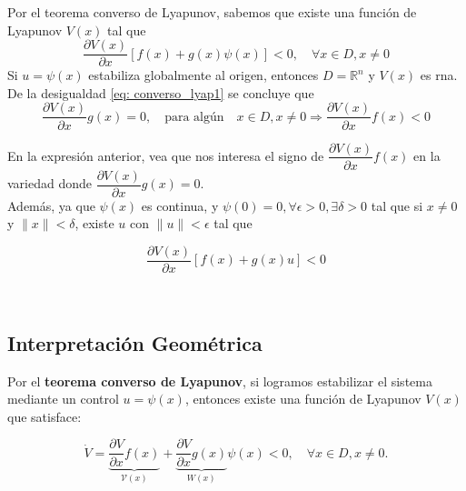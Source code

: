Por el teorema converso de Lyapunov, sabemos que existe una función de Lyapunov $V(x)$ tal que
\begin{equation}
	\dfrac{\partial V(x)}{\partial x} [f(x) + g(x)\psi(x)] < 0, \quad \forall x \in D, x \neq 0
	\label{eq: converso_lyap1}
\end{equation}
Si $u = \psi(x)$ estabiliza globalmente al origen, entonces $D = \mathbb{R}^n$ y $V(x)$ es \gls{rna}.\\

De la desigualdad \eqref{eq: converso_lyap1} se concluye que
\begin{equation}
	\dfrac{\partial V(x)}{\partial x} g(x) = 0, \quad \text{para algún} \quad x \in D, x \neq 0 \Rightarrow \dfrac{\partial V(x)}{\partial x} f(x) < 0
	\label{eq: condicion_flc}
\end{equation}

En la expresión anterior, vea que nos interesa el signo de $\dfrac{\partial V(x)}{\partial x} f(x)$ en la variedad donde $\dfrac{\partial V(x)}{\partial x} g(x) = 0$.\\

Además, ya que $\psi(x)$ es continua, y $\psi(0) = 0, \forall \epsilon > 0, \exists \delta > 0$ tal que si $x \neq 0$ y $\|x\| < \delta$, existe $u$ con $\|u\| < \epsilon$ tal que

\begin{equation*}
	\dfrac{\partial V(x)}{\partial x} [f(x) + g(x)u] < 0
\end{equation*}

\\

\subsection{Interpretación Geométrica}

Por el \textbf{teorema converso de Lyapunov}, si logramos estabilizar el sistema mediante un control \( u = \psi(x) \), entonces existe una función de Lyapunov \( V(x) \) que satisface:

\begin{equation}
	\dot{V} = \underbrace{ \dfrac{\partial V}{\partial x} f(x) }_{\mathcal{V}(x)} +
	\underbrace{\dfrac{\partial V}{\partial x} g(x)}_{W(x)} \psi(x) < 0, \quad \forall x \in D, x \neq 0.
	\label{eq: lyapunov_interpretation}
\end{equation}

